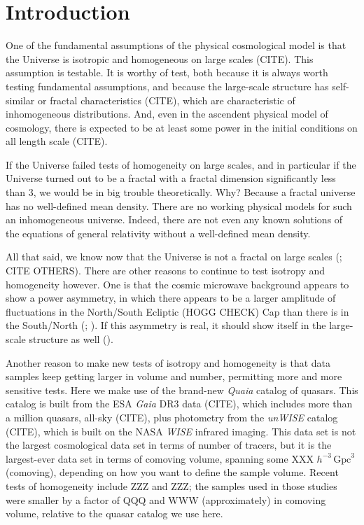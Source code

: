 \documentclass[modern]{aastex631}
\newcommand{\unit}[1]{\mathrm{#1}}
\newcommand{\Gpc}{\unit{Gpc}}
\begin{document}
\section*{}
\clearpage
\section{Introduction}\label{sec:intro}\noindent
One of the fundamental assumptions of the physical cosmological model is that the Universe is isotropic and homogeneous on large scales (CITE).
This assumption is testable.
It is worthy of test, both because it is always worth testing fundamental assumptions, and because the large-scale structure has self-similar or fractal characteristics (CITE), which are characteristic of inhomogeneous distributions.
And, even in the ascendent physical model of cosmology, there is expected to be at least some power in the initial conditions on all length scale (CITE).

If the Universe failed tests of homogeneity on large scales, and in particular if the Universe turned out to be a fractal with a fractal dimension significantly less than 3, we would be in big trouble theoretically.
Why?
Because a fractal universe has no well-defined mean density.
There are no working physical models for such an inhomogeneous universe.
Indeed, there are not even any known solutions of the equations of general relativity without a well-defined mean density.

All that said, we know now that the Universe is not a fractal on large scales (\citealt{hogg05}; CITE OTHERS).
There are other reasons to continue to test isotropy and homogeneity however.
One is that the cosmic microwave background appears to show a power asymmetry, in which there appears to be a larger amplitude of fluctuations in the North/South Ecliptic (HOGG CHECK) Cap than there is in the South/North (\citealt{wmapanisotropy}; \citealt{planckanisotropy}).
If this asymmetry is real, it should show itself in the large-scale structure as well (\citealt{zhai}).

Another reason to make new tests of isotropy and homogeneity is that data samples keep getting larger in volume and number, permitting more and more sensitive tests.
Here we make use of the brand-new \textsl{Quaia} catalog of quasars.
This catalog is built from the ESA \textsl{Gaia} DR3 data (CITE), which includes more than a million quasars, all-sky (CITE), plus photometry from the \textsl{unWISE} catalog (CITE), which is built on the NASA \textsl{WISE} infrared imaging.
This data set is not the largest cosmological data set in terms of number of tracers, but it is the largest-ever data set in terms of comoving volume, spanning some XXX $h^{-3}\,\Gpc^3$ (comoving), depending on how you want to define the sample volume.
Recent tests of homogeneity include ZZZ and ZZZ; the samples used in those studies were smaller by a factor of QQQ and WWW (approximately) in comoving volume, relative to the quasar catalog we use here.
\end{document}
